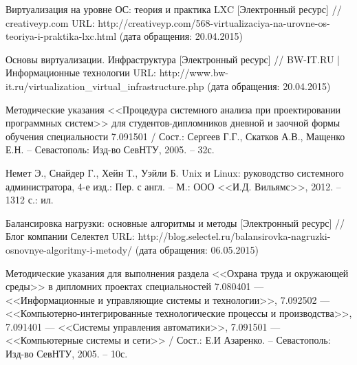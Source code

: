 \begin{thebibliography}{00}
    Виртуализация на уровне ОС: теория и практика LXC
    [Электронный ресурс] //
    creativeyp.com
    URL: http://creativeyp.com/568-virtualizaciya-na-urovne-os-teoriya-i-praktika-lxc.html
    (дата обращения: 20.04.2015)

    Основы виртуализации. Инфраструктура
    [Электронный ресурс] //
    BW-IT.RU | Информационные технологии
    URL: http://www.bw-it.ru/virtualization\_virtual\_infrastructure.php
    (дата обращения: 20.04.2015)

    Методические указания <<Процедура системного анализа при проектировании программных систем>>
    для студентов-дипломников дневной и заочной формы обучения специальности 7.091501 /
    Сост.: Сергеев Г.Г., Скатков А.В., Мащенко Е.Н. -- Севастополь:
    Изд-во СевНТУ, 2005. -- 32с.

    Немет Э., Снайдер Г., Хейн Т., Уэйли Б.
    Unix и Linux: руководство системного администратора,
    4-е изд.: Пер. с англ. -- М.: ООО <<И.Д. Вильямс>>, 2012. --
    1312 с.: ил.

    Балансировка нагрузки: основные алгоритмы и методы
    [Электронный ресурс] //
    Блог компании Селектел
    URL: http://blog.selectel.ru/balansirovka-nagruzki-osnovnye-algoritmy-i-metody/
    (дата обращения: 06.05.2015)

    Методические указания для выполнения раздела <<Охрана труда и окружающей среды>>
    в дипломних проектах специальностей
    7.080401 --- <<Информационные и управляющие системы и технологии>>,
    7.092502 --- <<Компьютерно-интегрированные технологические процессы и производства>>,
    7.091401 --- <<Системы управления автоматики>>,
    7.091501 --- <<Компьютерные системы и сети>> / Сост.: Е.И Азаренко. -- Севастополь:
    Изд-во СевНТУ, 2005. -- 10с.

\end{thebibliography}
\endgroup

\clearpage
